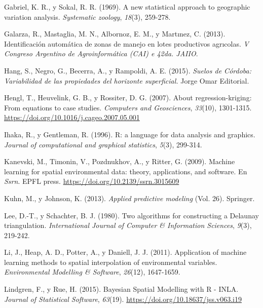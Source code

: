 \documentclass[11pt,b5paper,]{krantz}
\begin{document}
\leavevmode\hypertarget{ref-Gabriel_Sokal_1969}{}%
Gabriel, K. R., y Sokal, R. R. (1969). A new statistical approach to geographic variation analysis. \emph{Systematic zoology}, \emph{18}(3), 259-278.

\leavevmode\hypertarget{ref-Galarza_Mastaglia_Albornoz_Martux131nez_2013}{}%
Galarza, R., Mastaglia, M. N., Albornoz, E. M., y Martınez, C. (2013). Identificación automática de zonas de manejo en lotes productivos agrıcolas. \emph{V Congreso Argentino de Agroinformática (CAI) e 42da. JAIIO}.

\leavevmode\hypertarget{ref-Hang2015}{}%
Hang, S., Negro, G., Becerra, A., y Rampoldi, A. E. (2015). \emph{Suelos de Córdoba: Variabilidad de las propiedades del horizonte superficial.} Jorge Omar Editorial.

\leavevmode\hypertarget{ref-Hengl_Heuvelink_Rossiter_2007}{}%
Hengl, T., Heuvelink, G. B., y Rossiter, D. G. (2007). About regression-kriging: From equations to case studies. \emph{Computers and Geosciences}, \emph{33}(10), 1301-1315. \url{https://doi.org/10.1016/j.cageo.2007.05.001}

\leavevmode\hypertarget{ref-Ihaka_Gentleman_1996}{}%
Ihaka, R., y Gentleman, R. (1996). R: a language for data analysis and graphics. \emph{Journal of computational and graphical statistics}, \emph{5}(3), 299-314.

\leavevmode\hypertarget{ref-Kanevski_Timonin_Pozdnukhov_Ritter_2009}{}%
Kanevski, M., Timonin, V., Pozdnukhov, A., y Ritter, G. (2009). Machine learning for spatial environmental data: theory, applications, and software. En \emph{Ssrn}. EPFL press. \url{https://doi.org/10.2139/ssrn.3015609}

\leavevmode\hypertarget{ref-Kuhn_Johnson_2013}{}%
Kuhn, M., y Johnson, K. (2013). \emph{Applied predictive modeling} (Vol. 26). Springer.

\leavevmode\hypertarget{ref-Lee_Schachter_1980}{}%
Lee, D.-T., y Schachter, B. J. (1980). Two algorithms for constructing a Delaunay triangulation. \emph{International Journal of Computer \& Information Sciences}, \emph{9}(3), 219-242.

\leavevmode\hypertarget{ref-Li_Heap_Potter_Daniell_2011}{}%
Li, J., Heap, A. D., Potter, A., y Daniell, J. J. (2011). Application of machine learning methods to spatial interpolation of environmental variables. \emph{Environmental Modelling \& Software}, \emph{26}(12), 1647-1659.

\leavevmode\hypertarget{ref-Lindgren_Rue_2015}{}%
Lindgren, F., y Rue, H. (2015). Bayesian Spatial Modelling with R - INLA. \emph{Journal of Statistical Software}, \emph{63}(19). \url{https://doi.org/10.18637/jss.v063.i19}
\end{document}
